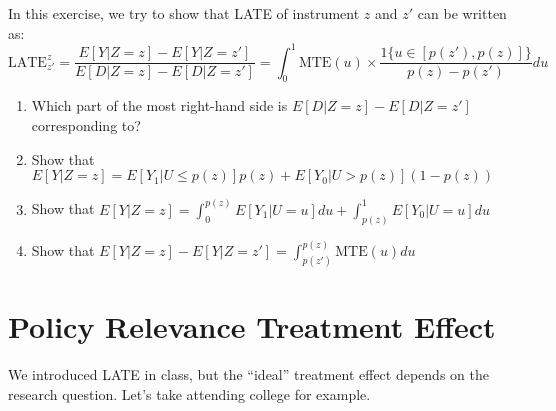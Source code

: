 \documentclass[11pt]{article}
\begin{document}
    In this exercise, we try to show that LATE of instrument \( z \) and \( z' \) can be written as:
    \[ \text{LATE}_{z'}^{z} = \frac{E[Y|Z=z] - E[Y|Z=z']}{E[D|Z=z] - E[D|Z=z']} = \int_{0}^{1} \text{MTE}(u) \times \frac{1\{u \in [p(z'),p(z)]\}}{p(z) - p(z')} du \]

    \begin{enumerate}
        \item Which part of the most right-hand side is \( E[D|Z=z] - E[D|Z=z'] \) corresponding to?
        \item Show that \( E[Y|Z=z] = E[Y_1|U \leq p(z)]p(z) + E[Y_0|U > p(z)](1 - p(z)) \)
        \item Show that \( E[Y|Z=z] = \int_{0}^{p(z)} E[Y_1|U = u] du + \int_{p(z)}^{1} E[Y_0|U = u] du \)
        \item Show that \( E[Y|Z=z] - E[Y|Z=z'] = \int_{p(z')}^{p(z)} \text{MTE}(u) du \)
    \end{enumerate}

    
    
\section{Policy Relevance Treatment Effect}

    We introduced LATE in class, but the ``ideal'' treatment effect depends on the research question. Let's take attending college for example.
\end{document}

